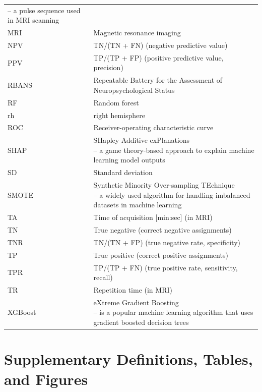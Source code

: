 \documentclass[diagnostics,article,accept,pdftex,moreauthors]{Definitions/mdpi}
\begin{document}
{\begin{tabular}{@{}ll}
{ -- a pulse sequence used in MRI scanning} \\  %
MRI & Magnetic resonance imaging \\
NPV & TN/(TN + FN) (negative predictive value)\\ 
PPV & TP/(TP + FP) (positive predictive value, precision)\\ 
RBANS & Repeatable Battery for the Assessment of Neuropsychological Status\\
RF & Random forest \\
rh & right hemisphere \\
ROC &  Receiver-operating characteristic curve\\
SHAP & \makecell[l]{SHapley Additive exPlanations \\
  --  a game theory-based approach to explain machine learning model outputs}\\ %
SD & Standard deviation \\
SMOTE & \makecell[l]{Synthetic Minority Over-sampling TEchnique \\
-- a widely used algorithm for handling imbalanced datasets in machine learning} \\ %
TA & Time of acquisition [min:sec] (in MRI)\\ %
TN & True negative (correct negative assignments) \\
TNR & TN/(TN + FP) (true negative rate, specificity)\\ 
TP &  True positive (correct positive assignments)\\
TPR & TP/(TP + FN) (true positive rate, sensitivity, recall)\\
TR & Repetition time (in MRI)\\
XGBoost & \makecell[l]{eXtreme Gradient Boosting \\
-- is a popular machine learning algorithm that uses gradient boosted decision trees}\\
\end{tabular}
}










\appendixstart
\appendix
\section{Supplementary Definitions, Tables, and Figures}
\end{document}
